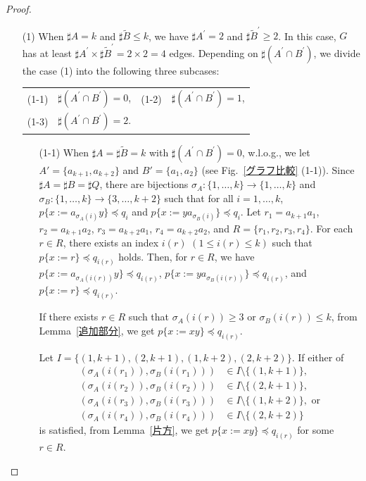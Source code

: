 \begin{proof}
\begin{enumerate}
\item[\textrm{(1)}] 
When $\sharp A=k$ and $\sharp \tilde{B} \le k$, we have $\sharp A^{\prime}=2$ and $\sharp \tilde{B}^{\prime} \ge 2$.
In this case, $G$ has at least $\sharp A^{\prime} \times \sharp \tilde{B}^{\prime}=2\times2=4$ edges.
Depending on $\sharp( A^{\prime} \cap B^{\prime} )$, we divide the case \textrm{(1)} into the following three subcases:
\smallskip

\begin{tabular}{llll}
\textrm{(1-1)} & $\sharp( A^{\prime} \cap B^{\prime} ) = 0$,&
\textrm{(1-2)} & $\sharp( A^{\prime} \cap B^{\prime} ) = 1$,\\
\textrm{(1-3)} & $\sharp( A^{\prime} \cap B^{\prime} ) = 2$.
\end{tabular}

\begin{enumerate}
\item[\textrm(1-1)]
When $\sharp A = \sharp \tilde{B} = k$ with $\sharp( A^{\prime} \cap B^{\prime} ) = 0$, w.l.o.g., we let $A'=\{a_{k+1},a_{k+2}\}$ and $B'=\{a_{1},a_{2}\}$ (see Fig.~\ref{グラフ比較} (1-1)).
Since $\sharp A = \sharp B = \sharp Q$, there are bijections $\sigma_{A} : \{1,\dots,k\} \rightarrow \{1,\dots,k\}$ and $\sigma_{B} : \{1,\dots,k\} \rightarrow \{3,\dots,k + 2\}$ such that for all $i = 1,\ldots,k$, $p \{ x:=a_{\sigma_{A}(i)}y \} \preceq q_{i}$ and $p \{ x:=ya_{\sigma_{B}(i)} \} \preceq q_{i}$.
Let $r_{1}=a_{k+1}a_{1}$, $r_{2}=a_{k+1}a_{2}$, $r_{3}=a_{k+2}a_{1}$, $r_{4}=a_{k+2}a_{2}$, and $R=\{r_{1}, r_{2}, r_{3}, r_{4}\}$.
For each $r \in R$, there exists an index $i(r)$ $(1\le i(r)\le k)$ such that $p \{x := r\} \preceq q_{i(r)}$ holds.
Then, for $r\in R$, we have $p \{ x:=a_{\sigma_{A}(i(r))}y \} \preceq q_{i(r)}$, $p \{ x:=ya_{\sigma_{B}(i(r))} \} \preceq q_{i(r)}$, and $p \{ x:=r \} \preceq q_{i(r)}$.
\smallskip

If there exists $r\in R$ such that $\sigma_{A}(i(r)) \ge 3$ or $\sigma_{B}(i(r)) \le k$, from Lemma~\ref{追加部分}, we get $p \{x := xy\} \preceq q_{i(r)}$.
\smallskip

Let $I = \{(1, k + 1), (2, k + 1), (1, k + 2), (2, k + 2)\}$.
If either of
\begin{align*}
(\sigma_{A}(i(r_{1})), \sigma_{B}(i(r_{1}))) &\in I\setminus\{(1, k + 1)\},\\
(\sigma_{A}(i(r_{2})), \sigma_{B}(i(r_{2}))) &\in I\setminus\{(2, k + 1)\},\\
(\sigma_{A}(i(r_{3})), \sigma_{B}(i(r_{3}))) &\in I\setminus\{(1, k + 2)\},\mbox{~or}\\
(\sigma_{A}(i(r_{4})), \sigma_{B}(i(r_{4}))) &\in I\setminus\{(2, k + 2)\}
\end{align*}
is satisfied, from Lemma~\ref{片方}, we get $p \{x := xy\} \preceq q_{i(r)}$ for some $r\in R$.
\smallskip


\end{enumerate}
\end{enumerate}
\end{proof}
